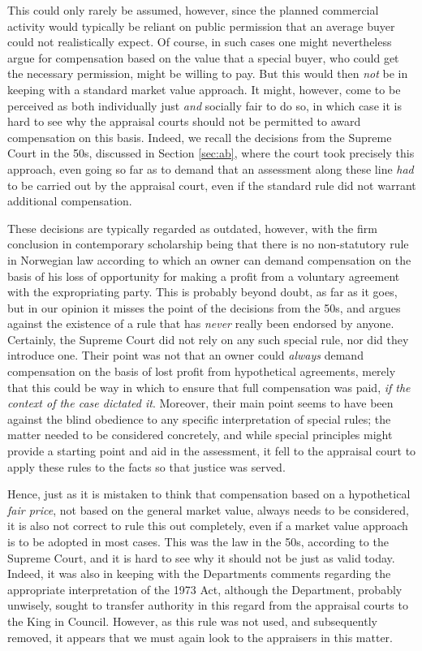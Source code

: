 \documentclass[10pt]{article} %
\begin{document}
This could only rarely be assumed, however, since the planned commercial activity would typically be reliant on public permission that an average buyer could not realistically expect. Of course, in such cases one might nevertheless argue for compensation based on the value that a special buyer, who could get the necessary permission, might be willing to pay. But this would then \emph{not} be in keeping with a standard market value approach. It might, however, come to be perceived as both individually just \emph{and} socially fair to do so, in which case it is hard to see why the appraisal courts should not be permitted to award compensation on this basis. Indeed, we recall the decisions from the Supreme Court in the 50s, discussed in Section \ref{sec:ab}, where the court took precisely this approach, even going so far as to demand that an assessment along these line \emph{had} to be carried out by the appraisal court, even if the standard rule did not warrant additional compensation.

These decisions are typically regarded as outdated, however, with the firm conclusion in contemporary scholarship being that there is no non-statutory rule in Norwegian law according to which an owner can demand compensation on the basis of his loss of opportunity for making a profit from a voluntary agreement with the expropriating party. This is probably beyond doubt, as far as it goes, but in our opinion it misses the point of the decisions from the 50s, and argues against the existence of a rule that has \emph{never} really been endorsed by anyone. Certainly, the Supreme Court did not rely on any such special rule, nor did they introduce one. Their point was not that an owner could \emph{always} demand compensation on the basis of lost profit from hypothetical agreements, merely that this could be way in which to ensure that full compensation was paid, \emph{if the context of the case dictated it}. Moreover, their main point seems to have been against the blind obedience to any specific interpretation of special rules; the matter needed to be considered concretely, and while special principles might provide a starting point and aid in the assessment, it fell to the appraisal court to apply these rules to the facts so that justice was served.

Hence, just as it is mistaken to think that compensation based on a hypothetical \emph{fair price}, not based on the general market value, always needs to be considered, it is also not correct to rule this out completely, even if a market value approach is to be adopted in most cases. This was the law in the 50s, according to the Supreme Court, and it is hard to see why it should not be just as valid today. Indeed, it was also in keeping with the Departments comments regarding the appropriate interpretation of the 1973 Act, although the Department, probably unwisely, sought to transfer authority in this regard from the appraisal courts to the King in Council. However, as this rule was not used, and subsequently removed, it appears that we must again look to the appraisers in this matter.
\end{document}
